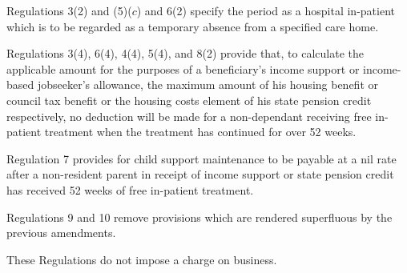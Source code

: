 \documentclass[12pt,a4paper]{article}
\begin{document}
Regulations 3(2) and (5)($c$)  and 6(2) specify the period as a hospital in-patient which is to be regarded as a temporary absence from a specified care home.

Regulations 3(4), 6(4), 4(4), 5(4), and 8(2) provide that, to calculate the applicable amount for the purposes of a beneficiary’s income support or income-based jobseeker’s allowance, the maximum amount of his housing benefit or council tax benefit or the housing costs element of his state pension credit respectively, no deduction will be made for a non-dependant receiving free in-patient treatment when the treatment has continued for over 52 weeks.

Regulation 7 provides for child support maintenance to be payable at a nil rate after a non-resident parent in receipt of income support or state pension credit has received 52 weeks of free in-patient treatment.

Regulations 9 and 10 remove provisions which are rendered superfluous by the previous amendments.

These Regulations do not impose a charge on business. 
\end{document}

